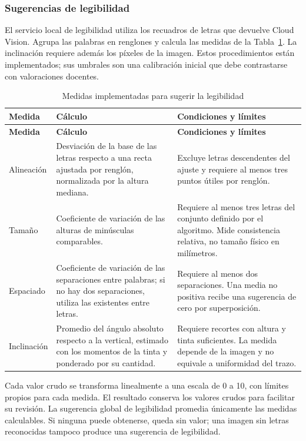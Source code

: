 \subsubsection{Sugerencias de legibilidad}

El servicio local de legibilidad utiliza los recuadros de letras que devuelve Cloud Vision. Agrupa las palabras en renglones y calcula las medidas de la Tabla~\ref{tab:medidas-legibilidad-analisis}. La inclinación requiere además los píxeles de la imagen. Estos procedimientos están implementados; sus umbrales son una calibración inicial que debe contrastarse con valoraciones docentes.

\begin{longtable}{|p{2.4cm}|p{6.5cm}|p{5.7cm}|}
\caption{Medidas implementadas para sugerir la legibilidad}
\label{tab:medidas-legibilidad-analisis} \\ \hline
\textbf{Medida} & \textbf{Cálculo} & \textbf{Condiciones y límites} \\ \hline
\endfirsthead
\hline
\textbf{Medida} & \textbf{Cálculo} & \textbf{Condiciones y límites} \\ \hline
\endhead
Alineación & Desviación de la base de las letras respecto a una recta ajustada por renglón, normalizada por la altura mediana. & Excluye letras descendentes del ajuste y requiere al menos tres puntos útiles por renglón. \\ \hline
Tamaño & Coeficiente de variación de las alturas de minúsculas comparables. & Requiere al menos tres letras del conjunto definido por el algoritmo. Mide consistencia relativa, no tamaño físico en milímetros. \\ \hline
Espaciado & Coeficiente de variación de las separaciones entre palabras; si no hay dos separaciones, utiliza las existentes entre letras. & Requiere al menos dos separaciones. Una media no positiva recibe una sugerencia de cero por superposición. \\ \hline
Inclinación & Promedio del ángulo absoluto respecto a la vertical, estimado con los momentos de la tinta y ponderado por su cantidad. & Requiere recortes con altura y tinta suficientes. La medida depende de la imagen y no equivale a uniformidad del trazo. \\ \hline
\end{longtable}

Cada valor crudo se transforma linealmente a una escala de 0 a 10, con límites propios para cada medida. El resultado conserva los valores crudos para facilitar su revisión. La sugerencia global de legibilidad promedia únicamente las medidas calculables. Si ninguna puede obtenerse, queda sin valor; una imagen sin letras reconocidas tampoco produce una sugerencia de legibilidad.

